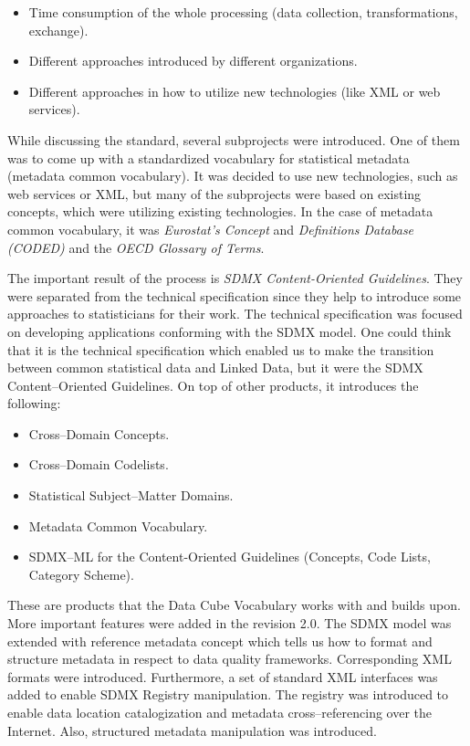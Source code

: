 \begin{itemize}
\item Time consumption of the whole processing (data collection, transformations, 
exchange).
\item Different approaches introduced by different organizations.
\item Different approaches in how to utilize new technologies (like XML or web 
services).
\end{itemize}

While discussing the standard, several subprojects were introduced. One of them was to come
up with a standardized vocabulary for statistical metadata (metadata common vocabulary). It was
decided to use new technologies, such as web services or XML, but many of the subprojects
were based on existing concepts, which were utilizing existing technologies. In the case of
metadata common vocabulary, it was \emph{Eurostat’s Concept} and
\emph{Definitions Database (CODED)} and the \emph{OECD Glossary of Terms}.

The important result of the process is \emph{SDMX Content-Oriented Guidelines}.
They were separated
from the technical specification since they help to introduce some approaches to statisticians
for their work. The technical specification was focused on developing applications
conforming with the SDMX model. One could think that it is the technical specification
which enabled us to make the transition between common statistical data and Linked Data,
but it were the SDMX Content--Oriented Guidelines. On top of other products, it introduces the
following:

\begin{itemize}
\item Cross--Domain Concepts.
\item Cross--Domain Codelists.
\item Statistical Subject--Matter Domains.
\item Metadata Common Vocabulary.
\item SDMX--ML for the Content-Oriented Guidelines (Concepts, Code Lists, Category 
Scheme).
\end{itemize}

These are products that the Data Cube Vocabulary works with and builds upon. More important
features were added in the revision 2.0. The SDMX model was extended with reference metadata
concept which tells us how to format and structure metadata in respect to data quality
frameworks. Corresponding XML formats were introduced. Furthermore, a set of standard XML
interfaces was added to enable SDMX Registry manipulation. The registry was introduced to
enable data location catalogization and metadata cross--referencing over the Internet. Also,
structured metadata manipulation was introduced.

